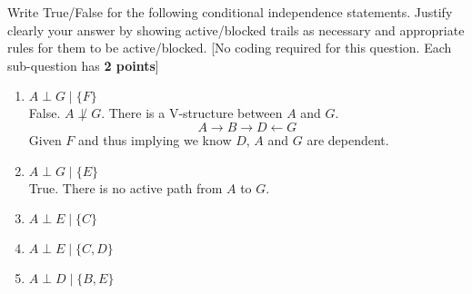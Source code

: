 \item Write True/False for the following conditional independence statements. Justify clearly your answer by showing active/blocked trails as necessary and appropriate rules for them to be active/blocked. [No coding required for this question. Each sub-question has \textbf{2 points}]

\begin{enumerate}
  \item $A \perp G \mid \{F\}$\\
        False. $A\not\perp G$. There is a V-structure between $A$ and $G$.
        $$A \rightarrow B \rightarrow D \leftarrow G$$
        Given $F$ and thus implying we know $D$, $A$ and $G$ are dependent.
  \item $A \perp G \mid \{E\}$\\
        True. There is no active path from $A$ to $G$.
  \item $A \perp E \mid \{C\}$
  \item $A \perp E \mid \{C, D\}$
  \item $A \perp D \mid \{B, E\}$
\end{enumerate}